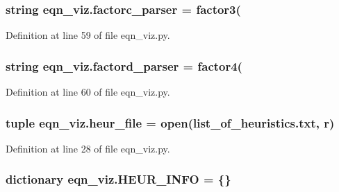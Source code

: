 \subsubsection[{factorc\+\_\+parser}]{\setlength{\rightskip}{0pt plus 5cm}string eqn\+\_\+viz.\+factorc\+\_\+parser = \textquotesingle{}factor3(\textquotesingle{}}\label{namespaceeqn__viz_addfe6dbd1f7e4817decc2f392291d743}


Definition at line 59 of file eqn\+\_\+viz.\+py.

\hypertarget{namespaceeqn__viz_a17e1b80ac39bb02b3448c7cc9e5e7821}{}
\subsubsection[{factord\+\_\+parser}]{\setlength{\rightskip}{0pt plus 5cm}string eqn\+\_\+viz.\+factord\+\_\+parser = \textquotesingle{}factor4(\textquotesingle{}}\label{namespaceeqn__viz_a17e1b80ac39bb02b3448c7cc9e5e7821}


Definition at line 60 of file eqn\+\_\+viz.\+py.

\hypertarget{namespaceeqn__viz_a1bea532f61715c9742cbbe0bef8e5121}{}
\subsubsection[{heur\+\_\+file}]{\setlength{\rightskip}{0pt plus 5cm}tuple eqn\+\_\+viz.\+heur\+\_\+file = open(\textquotesingle{}list\+\_\+of\+\_\+heuristics.\+txt\textquotesingle{}, \textquotesingle{}r\textquotesingle{})}\label{namespaceeqn__viz_a1bea532f61715c9742cbbe0bef8e5121}


Definition at line 28 of file eqn\+\_\+viz.\+py.

\hypertarget{namespaceeqn__viz_a8017c4f105a541309fcf639e7925a88b}{}
\subsubsection[{H\+E\+U\+R\+\_\+\+I\+N\+F\+O}]{\setlength{\rightskip}{0pt plus 5cm}dictionary eqn\+\_\+viz.\+H\+E\+U\+R\+\_\+\+I\+N\+F\+O = \{\}}\label{namespaceeqn__viz_a8017c4f105a541309fcf639e7925a88b}


